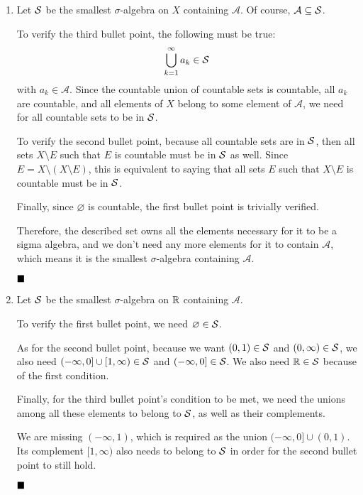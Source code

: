 \begin{enumerate}[label=\alph*)]
	\item Let $\mathcal{S}$ be the smallest $\sigma$-algebra on $X$ containing $\mathcal{A}$. Of course, $\mathcal{A}\subseteq\mathcal{S}$.
	
	To verify the third bullet point, the following must be true: \[\bigcup_{k=1}^{\infty}a_k\in\mathcal{S}\] with $a_k\in\mathcal{A}$. Since the countable union of countable sets is countable, all $a_k$ are countable, and all elements of $X$ belong to some element of $\mathcal{A}$, we need for all countable sets to be in $\mathcal{S}$.
	
	To verify the second bullet point, because all countable sets are in $\mathcal{S}$, then all sets $X\setminus E$ such that $E$ is countable must be in $\mathcal{S}$ as well. Since $E = X\setminus(X\setminus E)$, this is equivalent to saying that all sets $E$ such that $X\setminus E$ is countable must be in $\mathcal{S}$.
	
	Finally, since $\varnothing$ is countable, the first bullet point is trivially verified.
	
	Therefore, the described set owns all the elements necessary for it to be a sigma algebra, and we don't need any more elements for it to contain $\mathcal{A}$, which means it is the smallest $\sigma$-algebra containing $\mathcal{A}$.
	
	$\qed$
	
	\item Let $\mathcal{S}$ be the smallest $\sigma$-algebra on $\mathbb{R}$ containing $\mathcal{A}$.
	
	To verify the first bullet point, we need $\varnothing\in\mathcal{S}$.
	
	As for the second bullet point, because we want $(0,1)\in\mathcal{S}$ and $(0,\infty)\in\mathcal{S}$, we also need $(-\infty,0]\cup[1,\infty)\in\mathcal{S}$ and $(-\infty,0]\in\mathcal{S}$. We also need $\mathbb{R}\in\mathcal{S}$ because of the first condition.
	
	Finally, for the third bullet point's condition to be met, we need the unions among all these elements to belong to $\mathcal{S}$, as well as their complements.
	
	We are missing $(-\infty, 1)$, which is required as the union $(-\infty,0]\cup(0,1)$. Its complement $[1,\infty)$ also needs to belong to $\mathcal{S}$ in order for the second bullet point to still hold.
	
	$\qed$
\end{enumerate}

